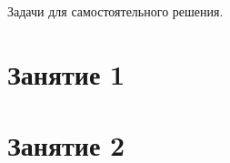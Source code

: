 \documentclass[14pt]{article}
\begin{document}
Задачи для самостоятельного решения.

\section{Занятие 1}



\clearpage

\section{Занятие 2}


\end{document}
